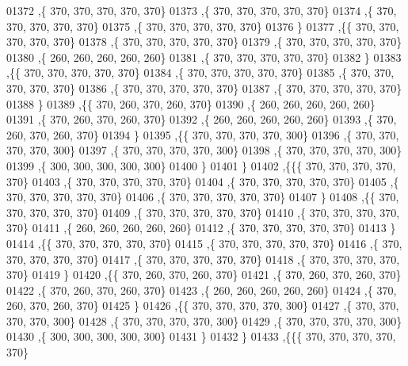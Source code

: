 \begin{DoxyCode}
01372    ,\{   370,   370,   370,   370,   370\}
01373    ,\{   370,   370,   370,   370,   370\}
01374    ,\{   370,   370,   370,   370,   370\}
01375    ,\{   370,   370,   370,   370,   370\}
01376    \}
01377   ,\{\{   370,   370,   370,   370,   370\}
01378    ,\{   370,   370,   370,   370,   370\}
01379    ,\{   370,   370,   370,   370,   370\}
01380    ,\{   260,   260,   260,   260,   260\}
01381    ,\{   370,   370,   370,   370,   370\}
01382    \}
01383   ,\{\{   370,   370,   370,   370,   370\}
01384    ,\{   370,   370,   370,   370,   370\}
01385    ,\{   370,   370,   370,   370,   370\}
01386    ,\{   370,   370,   370,   370,   370\}
01387    ,\{   370,   370,   370,   370,   370\}
01388    \}
01389   ,\{\{   370,   260,   370,   260,   370\}
01390    ,\{   260,   260,   260,   260,   260\}
01391    ,\{   370,   260,   370,   260,   370\}
01392    ,\{   260,   260,   260,   260,   260\}
01393    ,\{   370,   260,   370,   260,   370\}
01394    \}
01395   ,\{\{   370,   370,   370,   370,   300\}
01396    ,\{   370,   370,   370,   370,   300\}
01397    ,\{   370,   370,   370,   370,   300\}
01398    ,\{   370,   370,   370,   370,   300\}
01399    ,\{   300,   300,   300,   300,   300\}
01400    \}
01401   \}
01402  ,\{\{\{   370,   370,   370,   370,   370\}
01403    ,\{   370,   370,   370,   370,   370\}
01404    ,\{   370,   370,   370,   370,   370\}
01405    ,\{   370,   370,   370,   370,   370\}
01406    ,\{   370,   370,   370,   370,   370\}
01407    \}
01408   ,\{\{   370,   370,   370,   370,   370\}
01409    ,\{   370,   370,   370,   370,   370\}
01410    ,\{   370,   370,   370,   370,   370\}
01411    ,\{   260,   260,   260,   260,   260\}
01412    ,\{   370,   370,   370,   370,   370\}
01413    \}
01414   ,\{\{   370,   370,   370,   370,   370\}
01415    ,\{   370,   370,   370,   370,   370\}
01416    ,\{   370,   370,   370,   370,   370\}
01417    ,\{   370,   370,   370,   370,   370\}
01418    ,\{   370,   370,   370,   370,   370\}
01419    \}
01420   ,\{\{   370,   260,   370,   260,   370\}
01421    ,\{   370,   260,   370,   260,   370\}
01422    ,\{   370,   260,   370,   260,   370\}
01423    ,\{   260,   260,   260,   260,   260\}
01424    ,\{   370,   260,   370,   260,   370\}
01425    \}
01426   ,\{\{   370,   370,   370,   370,   300\}
01427    ,\{   370,   370,   370,   370,   300\}
01428    ,\{   370,   370,   370,   370,   300\}
01429    ,\{   370,   370,   370,   370,   300\}
01430    ,\{   300,   300,   300,   300,   300\}
01431    \}
01432   \}
01433  ,\{\{\{   370,   370,   370,   370,   370\}

\end{DoxyCode}
